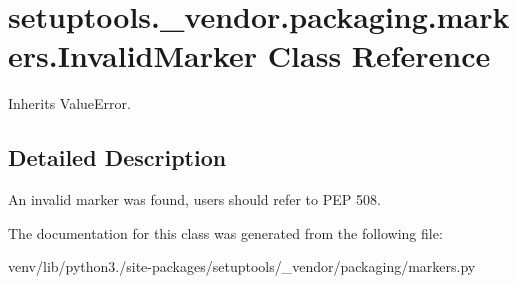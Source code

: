 \hypertarget{classsetuptools_1_1__vendor_1_1packaging_1_1markers_1_1_invalid_marker}{}\section{setuptools.\+\_\+vendor.\+packaging.\+markers.\+Invalid\+Marker Class Reference}
\label{classsetuptools_1_1__vendor_1_1packaging_1_1markers_1_1_invalid_marker}


Inherits Value\+Error.



\subsection{Detailed Description}
\begin{DoxyVerb}An invalid marker was found, users should refer to PEP 508.
\end{DoxyVerb}
 

The documentation for this class was generated from the following file\+:\begin{DoxyCompactItemize}
\item 
venv/lib/python3./site-\/packages/setuptools/\+\_\+vendor/packaging/markers.\+py\end{DoxyCompactItemize}
